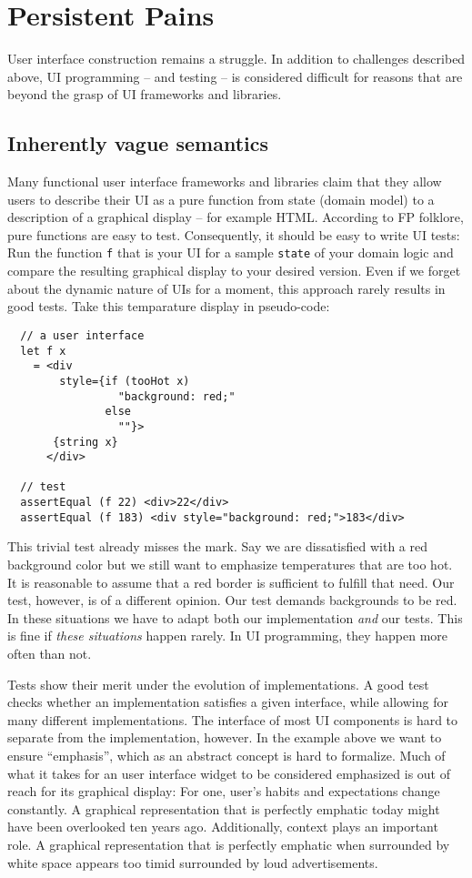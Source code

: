 \documentclass[sigplan,screen]{acmart}
\begin{document}
\section{Persistent Pains}

User interface construction remains a struggle. In addition to
challenges described above, UI programming -- and testing -- is
considered difficult for reasons that are beyond the grasp of UI
frameworks and libraries.

\subsection{Inherently vague semantics}

Many functional user interface frameworks and libraries claim that
they allow users to describe their UI as a pure function from state
(domain model) to a description of a graphical display -- for example
HTML. According to FP folklore, pure functions are easy to
test. Consequently, it should be easy to write UI tests: Run the
function \texttt{f} that is your UI for a sample \texttt{state} of
your domain logic and compare the resulting graphical display to your
desired version. Even if we forget about the dynamic nature of UIs for
a moment, this approach rarely results in good tests. Take this
temparature display in pseudo-code:
%
\begin{verbatim}
  // a user interface
  let f x
    = <div
        style={if (tooHot x)
                 "background: red;"
               else
                 ""}>
       {string x}
      </div>

  // test
  assertEqual (f 22) <div>22</div>
  assertEqual (f 183) <div style="background: red;">183</div>
\end{verbatim}
%
This trivial test already misses the mark. Say we are dissatisfied
with a red background color but we still want to emphasize
temperatures that are too hot. It is reasonable to assume that a red
border is sufficient to fulfill that need. Our test, however, is of a
different opinion. Our test demands backgrounds to be red. In these
situations we have to adapt both our implementation \textit{and} our
tests. This is fine if \textit{these situations} happen rarely. In UI
programming, they happen more often than not.

Tests show their merit under the evolution of implementations. A good
test checks whether an implementation satisfies a given interface,
while allowing for many different implementations. The interface of
most UI components is hard to separate from the implementation,
however. In the example above we want to ensure ``emphasis'', which as
an abstract concept is hard to formalize. Much of what it takes for an
user interface widget to be considered emphasized is out of reach for
its graphical display: For one, user's habits and expectations change
constantly. A graphical representation that is perfectly emphatic
today might have been overlooked ten years ago. Additionally, context
plays an important role. A graphical representation that is perfectly
emphatic when surrounded by white space appears too timid surrounded
by loud advertisements.
\end{document}
